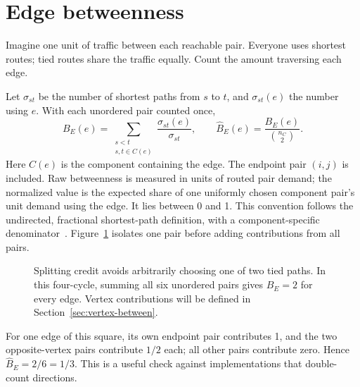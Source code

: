 \documentclass[11pt]{article}
\newcommand{\plain}[1]{\noindent #1\par\smallskip}
\begin{document}
\section{Edge betweenness}
\plain{Imagine one unit of traffic between each reachable pair. Everyone uses shortest routes; tied routes share the traffic equally. Count the amount traversing each edge.}
Let $\sigma_{st}$ be the number of shortest paths from $s$ to $t$, and $\sigma_{st}(e)$ the number using $e$. With each unordered pair counted once,
\begin{equation}
 B_E(e)=\sum_{\substack{s<t\\s,t\in C(e)}}\frac{\sigma_{st}(e)}{\sigma_{st}},
 \qquad \widehat B_E(e)=\frac{B_E(e)}{\binom{n_C}{2}}.
\end{equation}
Here $C(e)$ is the component containing the edge. The endpoint pair $(i,j)$ is included. Raw betweenness is measured in units of routed pair demand; the normalized value is the expected share of one uniformly chosen component pair's unit demand using the edge. It lies between 0 and 1. This convention follows the undirected, fractional shortest-path definition, with a component-specific denominator~\cite{nxedge,brandes}. Figure~\ref{fig:traffic} isolates one pair before adding contributions from all pairs.
\par
\begin{figure}[H]\centering
{}
\caption{Splitting credit avoids arbitrarily choosing one of two tied paths. In this four-cycle, summing all six unordered pairs gives $B_E=2$ for every edge. Vertex contributions will be defined in Section~\ref{sec:vertex-between}.}\label{fig:traffic}
\end{figure}
\par
For one edge of this square, its own endpoint pair contributes 1, and the two opposite-vertex pairs contribute $1/2$ each; all other pairs contribute zero. Hence $\widehat B_E=2/6=1/3$. This is a useful check against implementations that double-count directions.
\end{document}
